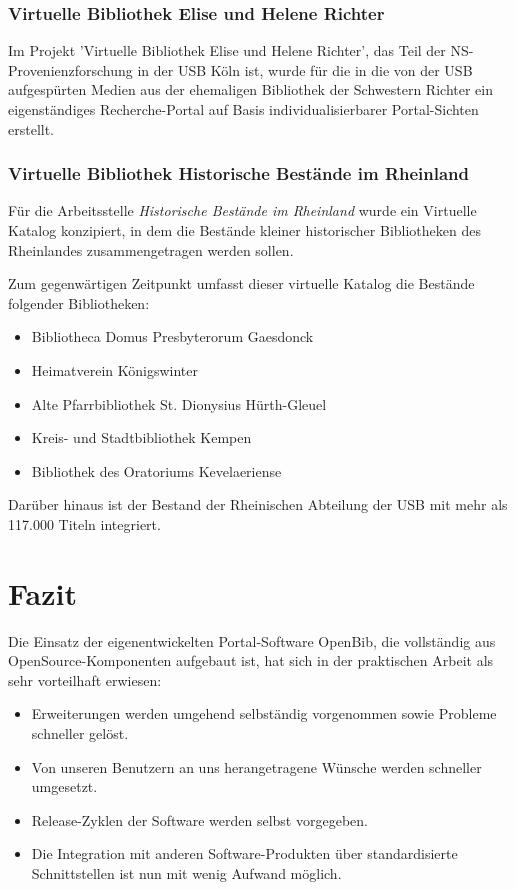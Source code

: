 \documentclass[11pt, twoside, a4paper, BCOR8mm, DIV12, bibtotoc,idxtotoc]{scrbook}
\begin{document}
\subsubsection{Virtuelle Bibliothek Elise und Helene Richter}

Im Projekt 'Virtuelle Bibliothek Elise und Helene Richter', das Teil
der NS-Provenienzforschung in der USB Köln ist, wurde für die
in die von der USB aufgespürten Medien aus der ehemaligen Bibliothek
der Schwestern Richter ein eigenständiges Recherche-Portal auf Basis
indi\-vi\-duali\-sierbarer Portal-Sichten erstellt.


\subsubsection{Virtuelle Bibliothek Historische Bestände im Rheinland}

Für die Arbeitsstelle \emph{Historische Bestände im Rheinland} wurde
ein Virtuelle Katalog konzipiert, in dem die Bestände kleiner
historischer Bibliotheken des Rheinlandes zusammengetragen werden
sollen.

Zum gegenwärtigen Zeitpunkt umfasst dieser virtuelle Katalog die Bestände folgender Bibliotheken:

\begin{itemize}
\item Bibliotheca Domus Presbyterorum Gaesdonck
\item Heimatverein Königswinter
\item Alte Pfarrbibliothek St. Dionysius Hürth-Gleuel
\item Kreis- und Stadtbibliothek Kempen
\item Bibliothek des Oratoriums Kevelaeriense
\end{itemize}

Darüber hinaus ist der Bestand der Rheinischen Abteilung der USB mit
mehr als 117.000 Titeln integriert.

\section{Fazit}

Die Einsatz der eigenentwickelten Portal-Software OpenBib, die
vollständig aus OpenSource-Komponenten aufgebaut ist, hat sich in der
praktischen Arbeit als sehr vorteilhaft erwiesen:

\begin{itemize}
\item Erweiterungen werden umgehend selbständig vorgenommen sowie
  Probleme schneller gelöst.
\item Von unseren Benutzern an uns herangetragene Wünsche werden
  schneller umgesetzt.
\item Release-Zyklen der Software werden selbst vorgegeben.
\item Die Integration mit anderen Software-Produkten über
  standardisierte Schnittstellen ist nun mit wenig Aufwand möglich.
\end{itemize}
    
\end{document}
